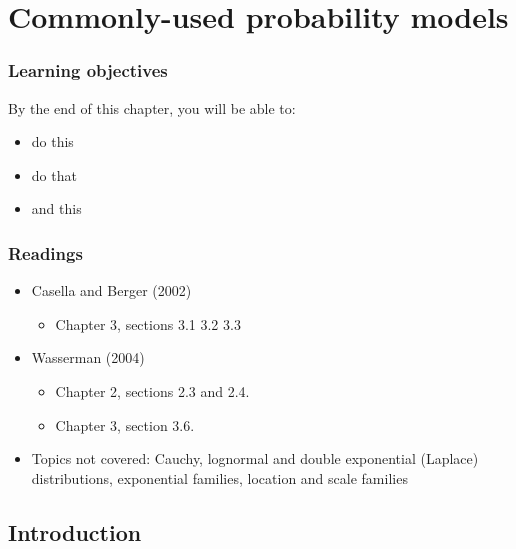 \documentclass[
]{book}
\providecommand{\tightlist}{%
  \setlength{\itemsep}{0pt}\setlength{\parskip}{0pt}}
\theoremstyle{definition}
\theoremstyle{definition}
\theoremstyle{definition}
\theoremstyle{definition}
\theoremstyle{remark}
\begin{document}
\hypertarget{commonly-used-probability-models}{%
\chapter{Commonly-used probability models}\label{commonly-used-probability-models}}

\hypertarget{learning-objectives-1}{%
\subsection*{Learning objectives}\label{learning-objectives-1}}

By the end of this chapter, you will be able to:

\begin{itemize}
\tightlist
\item
  do this
\item
  do that
\item
  and this
\end{itemize}

\hypertarget{readings-1}{%
\subsection*{Readings}\label{readings-1}}

\begin{itemize}
\tightlist
\item
  Casella and Berger (2002)

  \begin{itemize}
  \tightlist
  \item
    Chapter 3, sections 3.1 3.2 3.3
  \end{itemize}
\item
  Wasserman (2004)

  \begin{itemize}
  \tightlist
  \item
    Chapter 2, sections 2.3 and 2.4.
  \item
    Chapter 3, section 3.6.
  \end{itemize}
\item
  Topics not covered: Cauchy, lognormal and double exponential (Laplace) distributions, exponential families, location and scale families
\end{itemize}

\hypertarget{introduction}{%
\section{Introduction}\label{introduction}}
\end{document}
